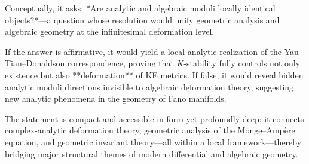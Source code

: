 Conceptually, it asks: *Are analytic and algebraic moduli locally identical objects?*—a question whose resolution would unify geometric analysis and algebraic geometry at the infinitesimal deformation level.  

If the answer is affirmative, it would yield a local analytic realization of the Yau–Tian–Donaldson correspondence, proving that \(K\)-stability fully controls not only existence but also **deformation** of KE metrics. If false, it would reveal hidden analytic moduli directions invisible to algebraic deformation theory, suggesting new analytic phenomena in the geometry of Fano manifolds.  

The statement is compact and accessible in form yet profoundly deep: it connects complex-analytic deformation theory, geometric analysis of the Monge–Ampère equation, and geometric invariant theory—all within a local framework—thereby bridging major structural themes of modern differential and algebraic geometry.